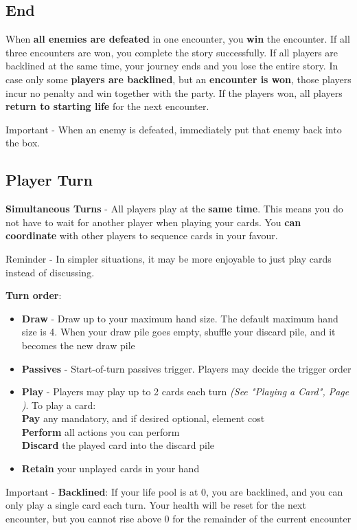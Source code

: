 \subsection*{End}
When  \textbf{all enemies are defeated} in one encounter, you  \textbf{win} the encounter. If all three encounters are won, you complete the story successfully.
If all players are backlined at the same time, your journey ends and you lose the entire story. In case only some  \textbf{players are backlined}, but an \textbf{encounter is won}, those players incur no penalty and win together with the party. If the players won, all players \textbf{return to starting life} for the next encounter.
\begin{tcolorbox}[colframe=red, colback=white]
Important - When an enemy is defeated, immediately put that enemy back into the box.
\end{tcolorbox}

\newpage

\subsection*{Player Turn}
\textbf{Simultaneous Turns} - All players play at the  \textbf{same time}. This means you do not have to wait for another player when playing your cards. You  \textbf{can coordinate} with other players to sequence cards in your favour.
\begin{tcolorbox}[colframe=blue, colback=white]
Reminder -	In simpler situations, it may be more enjoyable to just play cards instead of discussing.
\end{tcolorbox}
\textbf{Turn order}:
\begin{itemize}
	\item \textbf{Draw} - Draw up to your maximum hand size. The default maximum hand size is 4. When your draw pile goes empty, shuffle your discard pile, and it becomes the new draw pile
	\item \textbf{Passives} - Start-of-turn passives trigger. Players may decide the trigger order
	\item \textbf{Play} - Players may play up to 2 cards each turn \textit{(See "Playing a Card", Page \pageref{Section_PlayingACard})}.
	To play a card:\\ 
	\hspace*{1cm} \textbf{Pay} any mandatory, and if desired optional, element cost\\
	\hspace*{1cm} \textbf{Perform} all actions you can perform\\
	\hspace*{1cm} \textbf{Discard} the played card into the discard pile
	\item \textbf{Retain} your unplayed cards in your hand
\end{itemize}
\begin{tcolorbox}[colframe=red, colback=white]
	Important - \textbf{Backlined}: If your life pool is at 0, you are backlined, and you can only play a single card each turn. Your health will be reset for the next encounter, but you cannot rise above 0 for the remainder of the current encounter
\end{tcolorbox}
